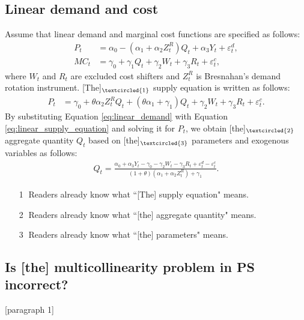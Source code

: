 \documentclass[11pt, a4paper]{article}
\begin{document}
\newpage
\subsection{Linear demand and cost}
Assume that linear demand and marginal cost functions are specified as follows:
\begin{align}
    P_t &= \alpha_0 - (\alpha_1 + \alpha_2Z^{R}_{t})Q_{t} + \alpha_3 Y_t + \varepsilon^{d}_{t},\label{eq:linear_demand}\\
    MC_t &= \gamma_0  + \gamma_1 Q_{t} + \gamma_2 W_{t} + \gamma_3 R_{t} + \varepsilon^{c}_{t},\label{eq:linear_marginal_cost}
\end{align}
where $W_{t}$ and $R_{t}$ are excluded cost shifters and $Z^{R}_{t}$ is Bresnahan's demand rotation instrument. 
[The]$_{\textcircled{1}}$ supply equation is written as follows:
\begin{align}
    P_t 
    &= \gamma_0 + \theta \alpha_2 Z^{R}_tQ_{t} + (\theta\alpha_1 + \gamma_1) Q_{t} + \gamma_2 W_t + \gamma_3 R_{t} +\varepsilon^c_t.\label{eq:linear_supply_equation}
\end{align}
By substituting Equation \eqref{eq:linear_demand} with Equation \eqref{eq:linear_supply_equation} and solving it for $P_t$, we obtain [the]$_{\textcircled{2}}$ aggregate quantity $Q_{t}$ based on [the]$_{\textcircled{3}}$ parameters and exogenous variables as follows:
\begin{align}
    Q_{t} =  \frac{\alpha_0 + \alpha_3 Y_t - \gamma_0 - \gamma_2 W_{t} - \gamma_3 R_{t} + \varepsilon^{d}_{t} - \varepsilon^{c}_{t}}{(1 + \theta) (\alpha_1 + \alpha_2 Z^{R}_{t}) + \gamma_1}.\label{eq:quantity_linear}
\end{align}

\begin{itemize}
    \item[\textcircled{1}] Readers already know what ``[The] supply equation"  means.
    \item[\textcircled{2}] Readers already know what ``[the] aggregate quantity"  means.
    \item[\textcircled{3}] Readers already know what ``[the] parameters"  means.
\end{itemize}

\newpage
\subsection{Is [the] multicollinearity problem in PS incorrect?}
[paragraph 1]
\end{document}
